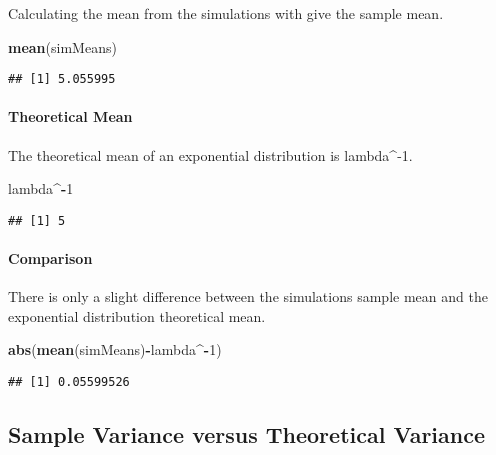 \documentclass[]{article}
\newenvironment{Shaded}{\begin{snugshade}}{\end{snugshade}}
\newcommand{\KeywordTok}[1]{\textcolor[rgb]{0.13,0.29,0.53}{\textbf{#1}}}
\newcommand{\DecValTok}[1]{\textcolor[rgb]{0.00,0.00,0.81}{#1}}
\newcommand{\OperatorTok}[1]{\textcolor[rgb]{0.81,0.36,0.00}{\textbf{#1}}}
\newcommand{\NormalTok}[1]{#1}
\let\oldparagraph\paragraph
\renewcommand{\paragraph}[1]{\oldparagraph{#1}\mbox{}}
\begin{document}
Calculating the mean from the simulations with give the sample mean.

\begin{Shaded}
\begin{Highlighting}[]
\KeywordTok{mean}\NormalTok{(simMeans)}
\end{Highlighting}
\end{Shaded}

\begin{verbatim}
## [1] 5.055995
\end{verbatim}

\paragraph{Theoretical Mean}\label{theoretical-mean}

The theoretical mean of an exponential distribution is lambda\^{}-1.

\begin{Shaded}
\begin{Highlighting}[]
\NormalTok{lambda}\OperatorTok{^-}\DecValTok{1}
\end{Highlighting}
\end{Shaded}

\begin{verbatim}
## [1] 5
\end{verbatim}

\paragraph{Comparison}\label{comparison}

There is only a slight difference between the simulations sample mean
and the exponential distribution theoretical mean.

\begin{Shaded}
\begin{Highlighting}[]
\KeywordTok{abs}\NormalTok{(}\KeywordTok{mean}\NormalTok{(simMeans)}\OperatorTok{-}\NormalTok{lambda}\OperatorTok{^-}\DecValTok{1}\NormalTok{)}
\end{Highlighting}
\end{Shaded}

\begin{verbatim}
## [1] 0.05599526
\end{verbatim}

\subsection{Sample Variance versus Theoretical
Variance}\label{sample-variance-versus-theoretical-variance}
\end{document}
